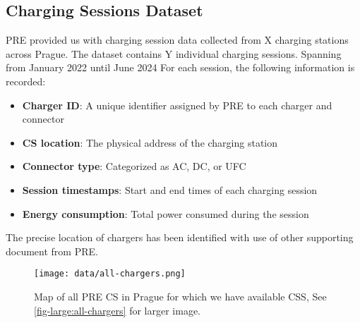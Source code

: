 \subsection{Charging Sessions Dataset}

PRE provided us with charging session data collected from X charging stations across Prague. The dataset contains Y individual charging sessions. Spanning from January 2022 until June 2024  For each session, the following information is recorded:

\begin{itemize}
    \item \textbf{Charger ID}: A unique identifier assigned by PRE to each charger and connector
    \item \textbf{\acrlong{CS} location}: The physical address of the charging station
    \item \textbf{Connector type}: Categorized as AC, DC, or UFC
    \item \textbf{Session timestamps}: Start and end times of each charging session
    \item \textbf{Energy consumption}: Total power consumed during the session
\end{itemize}


The precise location of chargers has been identified with use of other supporting document from PRE.

\begin{figure}[]
    \texttt{[image: data/all-chargers.png]}
    \caption{}{Map of all PRE \acrlong{CS} in Prague for which we have available \acrlong{CSS}, See \ref{fig-large:all-chargers} for larger image.}
\end{figure}

